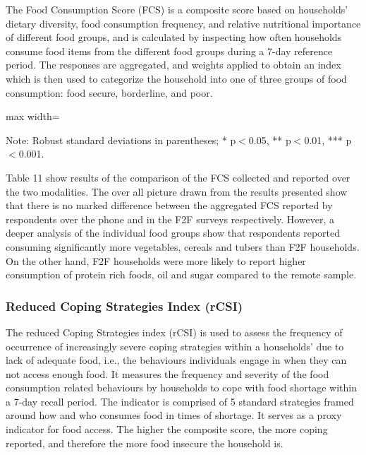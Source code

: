 \documentclass[11pt,harvard]{article}
\begin{document}
	The Food Consumption Score (FCS) is a composite score based on households’ dietary diversity, food consumption frequency, and relative nutritional importance of different food groups, and is calculated by inspecting how often households consume food items from the different food groups during a 7-day reference period. The responses are aggregated, and weights applied to obtain an index which is then used to categorize the household into one of three groups of food consumption: food secure, borderline, and poor.
	
	\begin{table}[htbp]
		\centering
		\begin{adjustbox}{max width=\textwidth}
			\begin{threeparttable}
				\caption{Impact of Survey Modality on Food Consumption Score and Food Groups}
				\scriptsize%
				 
				\label{tab:FCS_Modality_BF}
				\begin{tablenotes}
					\item Note: Robust standard deviations in parentheses; * p$<$0.05, ** p$<$0.01, *** p$<$0.001.
				\end{tablenotes}
			\end{threeparttable}
		\end{adjustbox}
	\end{table}
	
	Table 11 show results of the comparison of the FCS collected and reported over the two modalities. The over all picture drawn from the results presented show that there is no marked difference between the aggregated FCS reported by respondents over the phone and in the F2F surveys respectively. However, a deeper analysis of the individual food groups show that respondents reported consuming significantly more vegetables, cereals and tubers than F2F households. On the other hand, F2F households were more likely to report higher consumption of protein rich foods, oil and sugar compared to the remote sample.
	
	\pagebreak	
	
	
	\subsubsection{Reduced Coping Strategies Index (rCSI)}
	
	The reduced Coping Strategies index (rCSI) is used to assess the frequency of occurrence of increasingly severe coping strategies within a households’ due to lack of adequate food, i.e., the behaviours individuals engage in when they can not access enough food. It measures the frequency and severity of the food consumption related behaviours by households to cope with food shortage within a 7-day recall period. The indicator is comprised of 5 standard strategies framed around how and who consumes food in times of shortage. It serves as a proxy indicator for food access. The higher the composite score, the more coping reported, and therefore the more food insecure the household is.
	
\end{document}
